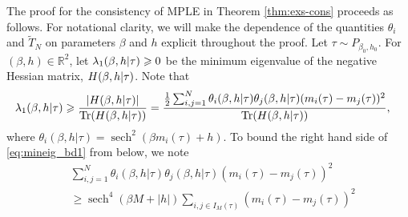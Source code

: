 \documentclass[letterpaper,11pt,reqno]{amsart}
\renewcommand{\le}{\leqslant}
\renewcommand{\ge}{\geqslant}
\renewcommand{\geq}{\geqslant}
\newcommand{\abs}[1]{\left\vert#1\right\vert}
\newcommand{\mvgs}{{\sigma}}
\newcommand{\mvgt}{{\tau}}
\DeclareMathOperator{\sech}{sech}
\begin{document}

The proof for the consistency of MPLE in Theorem \ref{thm:exs-cons} proceeds as follows.
For notational clarity, we will make the dependence of the quantities $\theta_i$ and  $\widetilde T_N$ on parameters $\beta$ and $h$ explicit throughout the proof. 
Let $\mvgt \sim P_{\beta_0, h_0}$. For $(\beta, h ) \in \mathbb{R}^2$, let $\gl_1(\gb,h |\mvgt)\geq 0$ be the minimum eigenvalue of the negative Hessian matrix, $H(\gb,h|\mvgt)$. 
Note that
\begin{align} \label{eq:mineig_bd1}
\gl_1(\gb, h |\mvgt) & \ge \frac{\abs{H(\gb ,h |\mvgt)}}{\mathrm{Tr}(H(\gb,h|\mvgt))} =  \frac{\frac12 \sum_{i,j=1}^N \theta_{i}(\beta, h| \mvgt) \theta_{j}(\beta, h| \mvgt)  (m_i(\mvgt)-m_j(\mvgt))^2}{\mathrm{Tr}(H(\gb,h|\mvgt))},
\end{align}
where $\theta_{i}(\beta, h| \mvgt) =\sech^2(\beta m_i(\mvgt) + h)$.
To bound the right hand side of \eqref{eq:mineig_bd1} from below, we note
\begin{align*}
 &\sum_{i,j=1}^N \theta_{i}(\beta, h| \mvgt) \theta_{j}(\beta, h| \mvgt)  (m_i(\mvgt)-m_j(\mvgt))^2 \\
 &\ge \sech^4( \beta M + |h|)   \sum_{i, j \in I_M(\mvgt)} (m_i(\mvgt)-m_j(\mvgt))^2
\end{align*}
\end{document}
